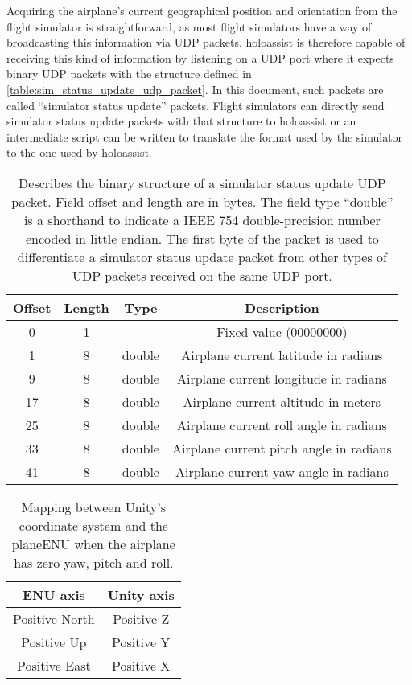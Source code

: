 Acquiring the airplane's current geographical position and orientation from the flight simulator is straightforward, as most flight simulators have a way of broadcasting this information via \gls{UDP} packets. \gls{holoassist} is therefore capable of receiving this kind of information by listening on a \gls{UDP} port where it expects binary \gls{UDP} packets with the structure defined in \autoref{table:sim_status_update_udp_packet}. In this document, such packets are called \enquote{simulator status update} packets. Flight simulators can directly send simulator status update packets with that structure to \gls{holoassist} or an intermediate script can be written to translate the format used by the simulator to the one used by \gls{holoassist}.

\begin{table}[p]
  \centering
  \begin{tabular}{c c c c}
    \toprule
      Offset & Length & Type & Description \\
    \midrule
      0 & 1 & \-- & Fixed value (00000000) \\
      1 & 8 & double & Airplane current latitude in radians \\
      9 & 8 & double & Airplane current longitude in radians \\
      17 & 8 & double & Airplane current altitude in meters \\
      25 & 8 & double & Airplane current roll angle in radians \\
      33 & 8 & double & Airplane current pitch angle in radians \\
      41 & 8 & double & Airplane current yaw angle in radians \\
    \bottomrule
  \end{tabular}
  \caption[Structure of a simulator status update packet]{Describes the binary structure of a simulator status update \gls{UDP} packet. Field offset and length are in bytes. The field type \enquote{double} is a shorthand to indicate a IEEE 754 double-precision number encoded in little endian. The first byte of the packet is used to differentiate a simulator status update packet from other types of \gls{UDP} packets received on the same \gls{UDP} port.}\label{table:sim_status_update_udp_packet}
\end{table}

\begin{table}[p]
  \centering
  \begin{tabular}{c c}
    \toprule
      ENU axis & Unity axis\\
    \midrule
      Positive North & Positive Z\\
      Positive Up & Positive Y\\
      Positive East & Positive X\\
    \bottomrule
  \end{tabular}
  \caption{Mapping between Unity's coordinate system and the \gls{planeENU} when the airplane has zero yaw, pitch and roll.}\label{table:enu_to_unity_mapping}
\end{table}


